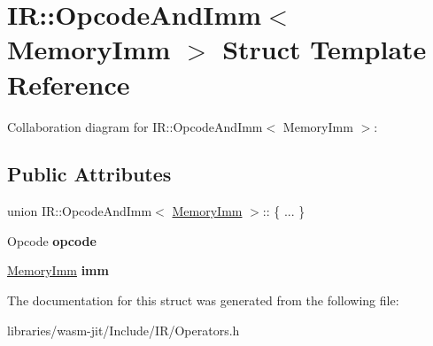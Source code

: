 \hypertarget{struct_i_r_1_1_opcode_and_imm_3_01_memory_imm_01_4}{}\section{IR\+:\+:Opcode\+And\+Imm$<$ Memory\+Imm $>$ Struct Template Reference}
\label{struct_i_r_1_1_opcode_and_imm_3_01_memory_imm_01_4}


Collaboration diagram for IR\+:\+:Opcode\+And\+Imm$<$ Memory\+Imm $>$\+:
\subsection*{Public Attributes}
\begin{DoxyCompactItemize}
\item 
\mbox{\label{struct_i_r_1_1_opcode_and_imm_3_01_memory_imm_01_4_a13307286d8ac87aa7a763c205cdff68d}} 
union I\+R\+::\+Opcode\+And\+Imm$<$ \mbox{\hyperlink{struct_i_r_1_1_memory_imm}{Memory\+Imm}} $>$\+:: \{ ... \}  
\item 
\mbox{\label{struct_i_r_1_1_opcode_and_imm_3_01_memory_imm_01_4_a5da88bdb74a8fb86f6d1cab640c88f28}} 
Opcode {\bfseries opcode}
\item 
\mbox{\label{struct_i_r_1_1_opcode_and_imm_3_01_memory_imm_01_4_a0d8b9783f74085c385d84b86f85ced6b}} 
\mbox{\hyperlink{struct_i_r_1_1_memory_imm}{Memory\+Imm}} {\bfseries imm}
\end{DoxyCompactItemize}


The documentation for this struct was generated from the following file\+:\begin{DoxyCompactItemize}
\item 
libraries/wasm-\/jit/\+Include/\+I\+R/Operators.\+h\end{DoxyCompactItemize}
